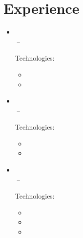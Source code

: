\documentclass[11pt,a4paper]{article}
\begin{document}
\section{Experience}
\begin{itemize}[leftmargin=0pt,label={},itemsep=2em,topsep=0pt]
\item \parbox{\textwidth}{\textbf{\KhonraadName} \hfill \textit{\KhonraadLocation}}\\
\textit{\KhonraadThirdJobTitle} \hfill \textit{\KhonraadFirstJobStart\,--\,\KhonraadThirdJobEnd}

\vspace{0.2cm}
{\color{secondary}Technologies:} \KhonraadTechnology
\vspace{0.3cm}
\begin{itemize}[leftmargin=*,topsep=-6pt,parsep=0pt,partopsep=0pt,itemsep=0pt]
    \item \KhonraadShort
    \item \KhonraadDotNet
\end{itemize} 


\item \parbox{\textwidth}{\textbf{\McfunshineName} \hfill \textit{\McfunshineLocation}}\\
\textit{\McfunshineJobTitle} \hfill \textit{\McfunshineJobStart\,--\,\McfunshineJobEnd}

\vspace{0.2cm}
{\color{secondary}Technologies:} \McfunshinePodmorphTechnology
\vspace{0.3cm}
\begin{itemize}[leftmargin=*,topsep=-6pt,parsep=0pt,partopsep=0pt,itemsep=0pt]
    \item \McfunshineShort
    \item \McfunshinePodmorphBaker
\end{itemize}


\item \parbox{\textwidth}{\textbf{\BakerName} \hfill \textit{\BakerLocation}}\\
\textit{\BakerFirstJobTitle} \hfill \textit{\BakerFirstJobStart\,--\,\BakerSecondJobEnd}

\vspace{0.2cm}
{\color{secondary}Technologies:} \BakerTechnology
\vspace{0.3cm}
\begin{itemize}[leftmargin=*,topsep=-6pt,parsep=0pt,partopsep=0pt,itemsep=0pt]
    \item \BakerSDK
    \item \BakerEcosystem
    \item \BakerDotContractor
\end{itemize}



\end{itemize}
\end{document}
